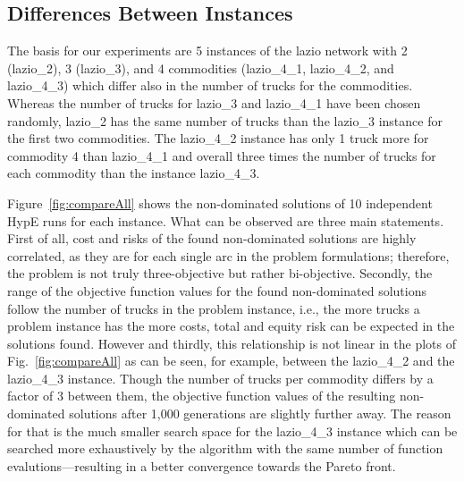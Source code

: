 \documentclass[preprint,12pt]{elsarticle}
\begin{document}
\subsection{Differences Between Instances}
The basis for our experiments are 5 instances of the lazio network with 2 (lazio\_2), 3 (lazio\_3), and 4 commodities (lazio\_4\_1, lazio\_4\_2, and lazio\_4\_3) which differ also in the number of trucks for the commodities. Whereas the number of trucks for lazio\_3 and lazio\_4\_1 have been chosen randomly, lazio\_2 has the same number of trucks than the lazio\_3 instance for the first two commodities. The lazio\_4\_2 instance has only 1 truck more for commodity 4 than lazio\_4\_1 and overall three times the number of trucks for each commodity than the instance lazio\_4\_3.

Figure~\ref{fig:compareAll} shows the non-dominated solutions of 10 independent HypE runs for each instance. What can be observed are three main statements. First of all, cost and risks of the found non-dominated solutions are highly correlated, as they are for each single arc in the problem formulations; therefore, the problem is not truly three-objective but rather bi-objective. Secondly, the range of the objective function values for the found non-dominated solutions follow the number of trucks in the problem instance, i.e., the more trucks a problem instance has the more costs, total and equity risk can be expected in the solutions found. However and thirdly, this relationship is not linear in the plots of Fig.~\ref{fig:compareAll} as can be seen, for example, between the lazio\_4\_2 and the lazio\_4\_3 instance. Though the number of trucks per commodity differs by a factor of 3 between them, the objective function values of the resulting non-dominated solutions after 1,000 generations are slightly further away. The reason for that is the much smaller search space for the lazio\_4\_3 instance which can be searched more exhaustively by the algorithm with the same number of function evalutions---resulting in a better convergence towards the Pareto front.
\end{document}
